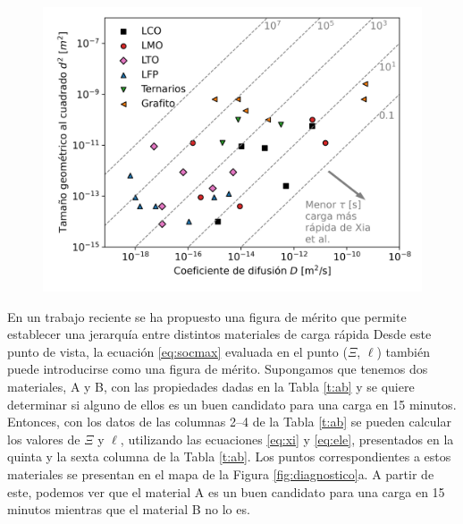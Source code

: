 \begin{figure}[h!]
    \centering
    \includegraphics[width=.7\textwidth]{FastCharging/un/introduccion/xiafom.png}
    \caption{}
    \label{fig:xiafom}
\end{figure}
En un trabajo reciente se ha propuesto una figura de mérito que permite establecer 
una jerarquía entre distintos materiales de carga rápida \cite{xia2022}
Desde
este punto de vista, la ecuación \ref{eq:socmax} evaluada en el punto ($\Xi$, 
$\ell$) también puede introducirse como una figura de mérito. Supongamos que 
tenemos dos materiales, A y B, con las propiedades dadas en la Tabla \ref{t:ab} y 
se quiere determinar si alguno de ellos es un buen candidato para una carga en 15 
minutos. Entonces, con los datos de las columnas 2--4 de la Tabla \ref{t:ab} 
se pueden calcular los valores de $\Xi$ y $\ell$, utilizando las ecuaciones 
\ref{eq:xi} y \ref{eq:ele}, presentados en la quinta y la sexta columna de la 
Tabla \ref{t:ab}. Los puntos correspondientes a estos materiales se presentan en 
el mapa de la Figura \ref{fig:diagnostico}a. A partir de este, podemos ver que el 
material A es un buen candidato para una carga en 15 minutos mientras que el 
material B no lo es.

